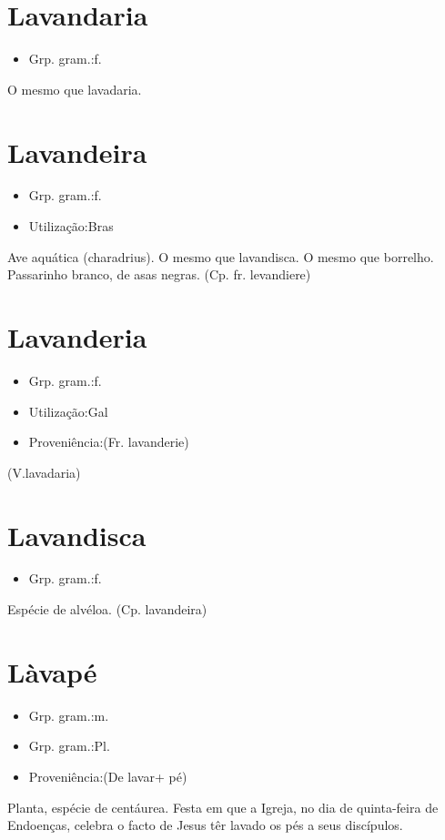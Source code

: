 \section{Lavandaria}
\begin{itemize}
\item {Grp. gram.:f.}
\end{itemize}
O mesmo que \textunderscore lavadaria\textunderscore .
\section{Lavandeira}
\begin{itemize}
\item {Grp. gram.:f.}
\end{itemize}
\begin{itemize}
\item {Utilização:Bras}
\end{itemize}
Ave aquática (\textunderscore charadrius\textunderscore ).
O mesmo que \textunderscore lavandisca\textunderscore .
O mesmo que \textunderscore borrelho\textunderscore .
Passarinho branco, de asas negras.
(Cp. fr. \textunderscore levandiere\textunderscore )
\section{Lavanderia}
\begin{itemize}
\item {Grp. gram.:f.}
\end{itemize}
\begin{itemize}
\item {Utilização:Gal}
\end{itemize}
\begin{itemize}
\item {Proveniência:(Fr. \textunderscore lavanderie\textunderscore )}
\end{itemize}
(V.lavadaria)
\section{Lavandisca}
\begin{itemize}
\item {Grp. gram.:f.}
\end{itemize}
Espécie de alvéloa.
(Cp. \textunderscore lavandeira\textunderscore )
\section{Làvapé}
\begin{itemize}
\item {Grp. gram.:m.}
\end{itemize}
\begin{itemize}
\item {Grp. gram.:Pl.}
\end{itemize}
\begin{itemize}
\item {Proveniência:(De \textunderscore lavar\textunderscore  + \textunderscore pé\textunderscore )}
\end{itemize}
Planta, espécie de centáurea.
Festa em que a Igreja, no dia de quinta-feira de Endoenças, celebra o facto de Jesus têr lavado os pés a seus discípulos.

